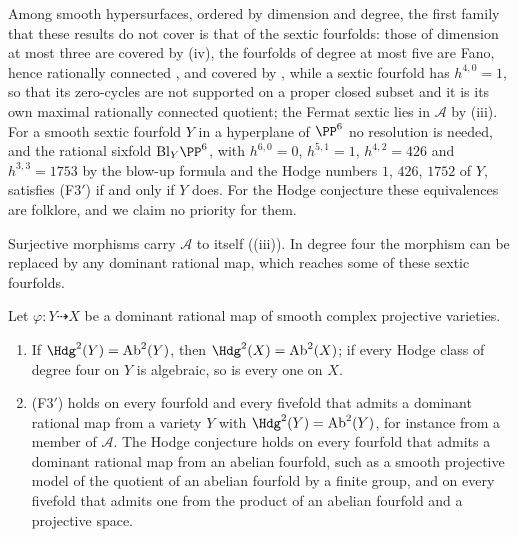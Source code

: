 \begin{remark}
Among smooth hypersurfaces, ordered by dimension and degree, the first
family that these results do not cover is that of the sextic fourfolds:
those of dimension at most three are covered by (iv),
the fourfolds of degree at most five are Fano, hence rationally connected
\cite{Cam92,KMM92}, and covered by , while a sextic
fourfold has $h^{4,0}=1$, so that its zero-cycles are not supported on a
proper closed subset and it is its own maximal rationally connected
quotient; the Fermat sextic lies in $\mathcal{A}$ by
(iii). For a smooth sextic fourfold $Y$ in a
hyperplane of $\PP^{6}$ no resolution is needed, and the rational sixfold
$\mathrm{Bl}_{Y}\PP^{6}$, with $h^{6,0}=0$, $h^{5,1}=1$, $h^{4,2}=426$ and
$h^{3,3}=1753$ by the blow-up formula \cite[\S7.3.3]{Voi02} and the Hodge
numbers $1$, $426$, $1752$ of $Y$, satisfies \textup{(F3$'$)} if and only if
$Y$ does. For the Hodge
conjecture these equivalences are folklore, and we claim no priority for
them.
\end{remark}

Surjective morphisms carry $\mathcal{A}$ to itself ((iii)).
In degree four the morphism can be replaced by any dominant rational map,
which reaches some of these sextic fourfolds.

\begin{proposition}
\label{prop:f3primedominant}
Let $\varphi\colon Y\dashrightarrow X$ be a dominant rational map of smooth
complex projective varieties.
\begin{enumerate}[label=\textup{(\roman*)},leftmargin=2.6em,itemsep=2pt]
\item If $\Hdg^{2}(Y)=\mathrm{Ab}^{2}(Y)$, then
  $\Hdg^{2}(X)=\mathrm{Ab}^{2}(X)$; if every Hodge class of degree four on
  $Y$ is algebraic, so is every one on $X$.
\item \textup{(F3$'$)} holds on every fourfold and every fivefold that
  admits a dominant rational map from a variety $Y$ with
  $\Hdg^{2}(Y)=\mathrm{Ab}^{2}(Y)$, for instance from a member of
  $\mathcal{A}$. The Hodge conjecture holds on every fourfold that admits a
  dominant rational map from an abelian fourfold, such as a smooth
  projective model of the quotient of an abelian fourfold by a finite group,
  and on every fivefold that admits one from the product of an abelian
  fourfold and a projective space.
\end{enumerate}
\end{proposition}

